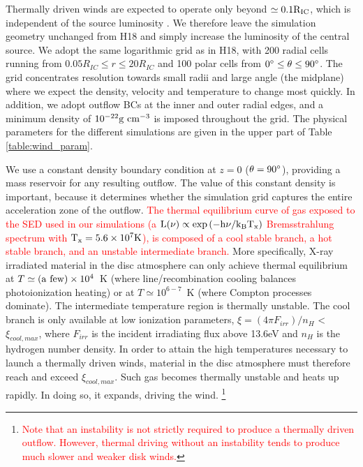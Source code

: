\documentclass[a4paper,fleqn,usenatbib]{mnras}
\begin{document}
 Thermally driven winds are expected to operate only beyond $\simeq 0.1 \rm{R_{IC}}$, which is
 independent of the source luminosity \citep[][hereafter W96]{1996ApJ...461..767W}. We therefore leave the 
 simulation geometry unchanged
from H18 and simply increase the luminosity of the central source. We
adopt the same logarithmic grid as in H18, with 200 radial cells running from $0.05R_{IC} \leq r \leq 20 R_{IC}$
and 100 polar cells from $0\degree \leq \theta \leq 90\degree$. The grid concentrates
resolution towards small radii and large angle (the midplane) 
where we expect the density, velocity and temperature to change most quickly.
In addition, we adopt outflow BCs at the inner and outer radial edges, and a minimum density of $10^{-22}\rm{g~cm^{-3}}$ is imposed throughout the grid.
The physical parameters for the different simulations are 
given in the upper part of Table \ref{table:wind_param}. 

We use a constant density boundary condition at $z = 0$ ($\theta=90\degree$), providing
a mass reservoir for any resulting outflow.
The value of this constant density is important, because it determines
whether the simulation grid captures the entire acceleration zone of
the outflow. \textcolor{red}{The thermal equilibrium curve of gas exposed to the SED used in our simulations 
(a $\rm{L(\nu)\propto \exp{(-h\nu/k_BT_x)}}$ Bremsstrahlung spectrum with $\rm{T_x=5.6\times10^7K}$), 
is composed of a cool stable branch, a hot stable branch, and an unstable intermediate branch.} More specifically, X-ray irradiated
material in the disc atmosphere can only achieve thermal equilibrium
at $T \simeq ({\rm a~few}) \times 10^4$~K (where line/recombination
cooling balances photoionization heating) or at $T \simeq 10^{6-7}$~K
(where Compton processes dominate). The intermediate temperature
region is thermally unstable. The cool branch is only available at low 
ionization parameters, $\xi = (4\pi F_{irr}) / n_H$ < $\xi_{cool,max}$,
where $F_{irr}$ is the incident irradiating flux above 13.6eV and $n_H$ is the
hydrogen number density. In order to attain the high temperatures 
necessary to launch a thermally driven winds, material in the disc atmosphere must
therefore reach and exceed $\xi_{cool,max}$. Such gas becomes
thermally unstable and heats up rapidly. In doing so, it expands,
driving the wind.
\footnote{\textcolor{red}{Note that an instability is not strictly required to
    produce a thermally driven outflow. However, thermal driving 
    without an instability tends to produce much slower and
    weaker disk winds\citep{2015ApJ...807..107H}.}} 
\end{document}
